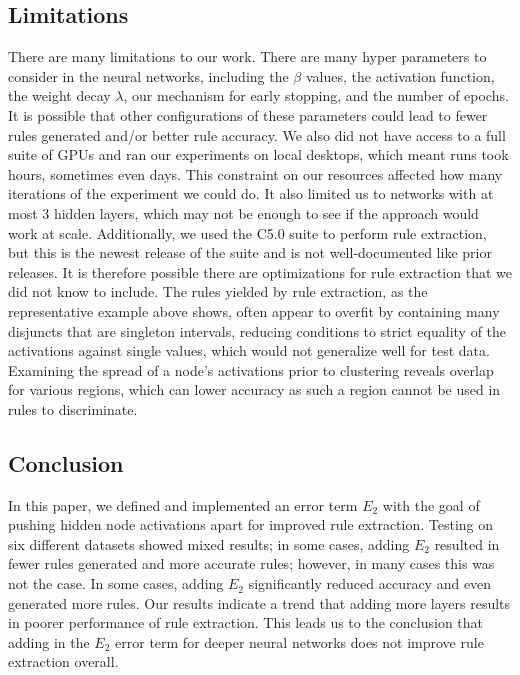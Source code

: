 \subsection{Limitations}
\label{sec:limitations}
There are many limitations to our work. There are many
hyper parameters to consider in the neural networks, including the
$\beta$ values, the activation function, the weight decay $\lambda$,
our mechanism for early stopping, and the number of epochs. It is possible that other configurations of these
parameters could lead to fewer rules generated and/or better rule
accuracy. We also did not have access to a full suite of GPUs
and ran our experiments on local desktops, which meant runs took
hours, sometimes even days. This constraint on our resources affected
how many iterations of the experiment we could do. It also limited us to networks with at most 3 hidden layers, which may not be enough
to see if the approach would work at scale. Additionally, we
used the C5.0 suite to perform rule extraction, but this is the newest
release of the suite and is not well-documented like prior releases. It is
therefore possible there are optimizations for rule extraction that we
did not know to include. The rules yielded by rule extraction, as the representative example above shows, often appear to overfit by containing many disjuncts that are singleton intervals, reducing conditions to strict equality of the activations against single values, which would not generalize well for test data. Examining the spread of a node's activations prior to clustering reveals overlap for various regions, which can lower accuracy as such a region cannot be used in rules to discriminate.

\subsection{Conclusion}
\label{sec:conclusion}

In this paper, we defined and implemented an error term $E_2$ with the goal
of pushing hidden node activations apart for improved rule extraction. Testing
on six different datasets showed mixed results; in some cases, adding $E_2$ resulted
in fewer rules generated and more accurate rules; however, in many cases this
was not the case. In some cases, adding $E_2$ significantly reduced accuracy
and even generated more rules. Our results indicate a trend that adding
more layers results in poorer performance of rule extraction. This leads us
to the conclusion that adding in the $E_2$ error term for deeper neural networks
does not improve rule extraction overall.

